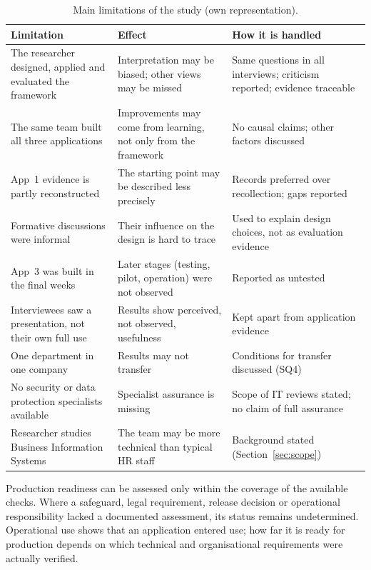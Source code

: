 \documentclass[10pt,a4paper]{article}
\begin{document}
\begin{table}[H]
\centering\small
\caption{Main limitations of the study (own representation).}
\label{tab:limitations}
\begin{tabular}{@{}p{.28\linewidth}p{.32\linewidth}p{.32\linewidth}@{}}
\toprule
\textbf{Limitation} & \textbf{Effect} & \textbf{How it is handled} \\
\midrule
The researcher designed, applied and evaluated the framework & Interpretation may be biased; other views may be missed & Same questions in all interviews; criticism reported; evidence traceable \\
\addlinespace
The same team built all three applications & Improvements may come from learning, not only from the framework & No causal claims; other factors discussed \\
\addlinespace
App~1 evidence is partly reconstructed & The starting point may be described less precisely & Records preferred over recollection; gaps reported \\
\addlinespace
Formative discussions were informal & Their influence on the design is hard to trace & Used to explain design choices, not as evaluation evidence \\
\addlinespace
App~3 was built in the final weeks & Later stages (testing, pilot, operation) were not observed & Reported as untested \\
\addlinespace
Interviewees saw a presentation, not their own full use & Results show perceived, not observed, usefulness & Kept apart from application evidence \\
\addlinespace
One department in one company & Results may not transfer & Conditions for transfer discussed (SQ4) \\
\addlinespace
No security or data protection specialists available & Specialist assurance is missing & Scope of IT reviews stated; no claim of full assurance \\
\addlinespace
Researcher studies Business Information Systems & The team may be more technical than typical HR staff & Background stated (Section~\ref{sec:scope}) \\
\bottomrule
\end{tabular}
\end{table}
 

Production readiness can be assessed only within the coverage of the
available checks. Where a safeguard, legal requirement, release
decision or operational responsibility lacked a documented assessment,
its status remains undetermined. Operational use shows that an
application entered use; how far it is ready for production depends on
which technical and organisational requirements were actually verified.
 
\end{document}
